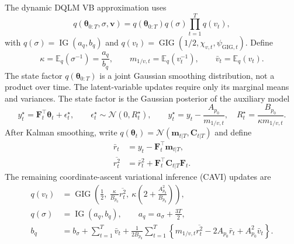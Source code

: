 \documentclass[nojss,noheadings]{jss}
\renewcommand{\E}{\mathbb{E}}
\newcommand{\vect}[1]{\bm{#1}}
\newcommand{\mat}[1]{\mathbf{#1}}
\newcommand{\N}{\mathcal{N}}
\newcommand{\IG}{\operatorname{IG}}
\newcommand{\GIG}{\operatorname{GIG}}
\begin{document}
The dynamic DQLM VB approximation uses
\begin{equation}
q(\vect{\theta}_{0:T},\sigma,\vect{v})
=q(\vect{\theta}_{0:T})q(\sigma)\prod_{t=1}^Tq(v_t),
\label{eq:dyn_dqlm_mf}
\end{equation}
with $q(\sigma)=\IG(a_q,b_q)$ and
$q(v_t)=\GIG(1/2,\chi_{v,t},\psi_{\mathrm{GIG},t})$. Define
\begin{equation}
\kappa=\E_q(\sigma^{-1})=\frac{a_q}{b_q},\qquad
m_{1/v,t}=\E_q(v_t^{-1}),\qquad
\bar v_t=\E_q(v_t).
\end{equation}
The state factor $q(\vect{\theta}_{0:T})$ is a joint Gaussian smoothing
distribution, not a product over time. The latent-variable updates require
only its marginal means and variances.
The state factor is the Gaussian posterior of the auxiliary model
\begin{equation}
y_t^\star=\mat{F}_t^\top\vect{\theta}_t+\epsilon_t^\star,\qquad
\epsilon_t^\star\sim\N(0,R_t^\star),
\qquad
y_t^\star=y_t-\frac{A_{p_0}}{m_{1/v,t}},\quad
R_t^\star=\frac{B_{p_0}}{\kappa m_{1/v,t}}.
\label{eq:dyn_dqlm_vb_pseudo}
\end{equation}
After Kalman smoothing, write
$q(\vect{\theta}_t)=\N(\vect{m}_{t|T},\mat{C}_{t|T})$ and define
\begin{align}
\bar r_t &= y_t-\mat{F}_t^\top\vect{m}_{t|T},\\
\overline{r_t^2}
&= \bar r_t^2+\mat{F}_t^\top\mat{C}_{t|T}\mat{F}_t.
\end{align}
The remaining coordinate-ascent variational inference (CAVI) updates are
\begin{align}
q(v_t)&=\GIG\left(
\frac{1}{2},\
\frac{\kappa}{B_{p_0}}\overline{r_t^2},\
\kappa\left(2+\frac{A_{p_0}^2}{B_{p_0}}\right)\right), \\
q(\sigma)&=\IG(a_q,b_q), \qquad
a_q=a_\sigma+\frac{3T}{2},\\
b_q&=b_\sigma+\sum_{t=1}^T\bar v_t+
\frac{1}{2B_{p_0}}\sum_{t=1}^T
\left\{m_{1/v,t}\overline{r_t^2}-2A_{p_0}\bar r_t+A_{p_0}^2\bar v_t\right\}.
\label{eq:dyn_dqlm_vb_sigma}
\end{align}
\end{document}
